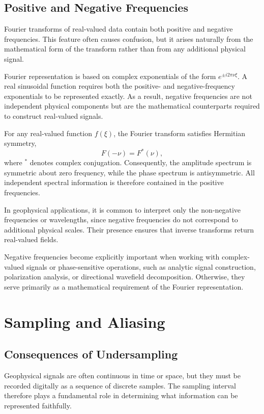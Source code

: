 \subsection{Positive and Negative Frequencies}

Fourier transforms of real-valued data contain both positive and negative frequencies. This feature often causes confusion, but it arises naturally from the mathematical form of the transform rather than from any additional physical signal.

Fourier representation is based on complex exponentials of the form $e^{\pm i2\pi\nu\xi}$. A real sinusoidal function requires both the positive- and negative-frequency exponentials to be represented exactly. As a result, negative frequencies are not independent physical components but are the mathematical counterparts required to construct real-valued signals.

For any real-valued function $f(\xi)$, the Fourier transform satisfies Hermitian symmetry,
\[
F(-\nu) = F^*(\nu),
\]
where $^*$ denotes complex conjugation. Consequently, the amplitude spectrum is symmetric about zero frequency, while the phase spectrum is antisymmetric. All independent spectral information is therefore contained in the positive frequencies.

In geophysical applications, it is common to interpret only the non‑negative frequencies or wavelengths, since negative frequencies do not correspond to additional physical scales. Their presence ensures that inverse transforms return real-valued fields.

Negative frequencies become explicitly important when working with complex-valued signals or phase-sensitive operations, such as analytic signal construction, polarization analysis, or directional wavefield decomposition. Otherwise, they serve primarily as a mathematical requirement of the Fourier representation.

\section{Sampling and Aliasing}\label{sec:aliasing}

\subsection{Consequences of Undersampling}

Geophysical signals are often continuous in time or space, but they must be recorded digitally as a sequence of discrete samples. The sampling interval therefore plays a fundamental role in determining what information can be represented faithfully.

